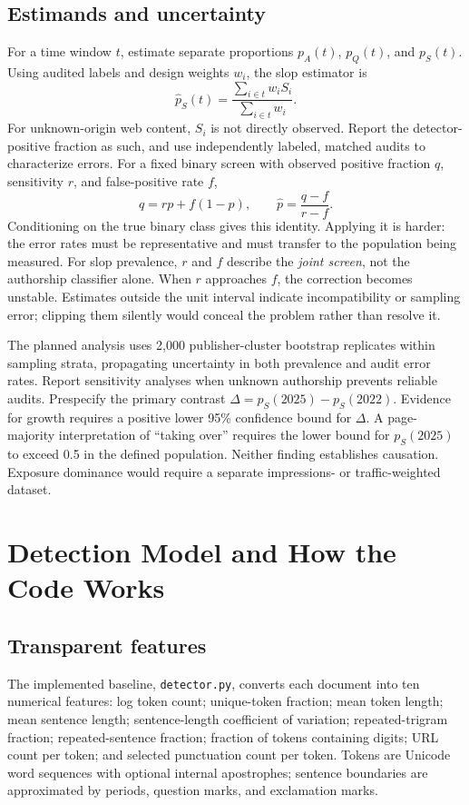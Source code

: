 \documentclass[11pt]{article}
\begin{document}
\subsection{Estimands and uncertainty}
For a time window $t$, estimate separate proportions $p_A(t)$, $p_Q(t)$, and
$p_S(t)$. Using audited labels and design weights $w_i$, the slop estimator is
\begin{equation}
 \widehat p_S(t)=\frac{\sum_{i\in t}w_i S_i}{\sum_{i\in t}w_i}.
\end{equation}
For unknown-origin web content, $S_i$ is not directly observed. Report the
detector-positive fraction as such, and use independently labeled, matched
audits to characterize errors. For a fixed binary screen with observed
positive fraction $q$, sensitivity $r$, and false-positive rate $f$,
\begin{equation}
 q = r p + f(1-p),\qquad
 \widehat p = \frac{q-f}{r-f}.
 \label{eq:correction}
\end{equation}
Conditioning on the true binary class gives this identity. Applying it is
harder: the error rates must be representative and must transfer to the
population being measured. For slop prevalence, $r$ and $f$ describe the
\emph{joint screen}, not the authorship classifier alone. When $r$ approaches
$f$, the correction becomes unstable. Estimates outside the unit interval
indicate incompatibility or sampling error; clipping them silently would
conceal the problem rather than resolve it.

The planned analysis uses 2,000 publisher-cluster bootstrap replicates within
sampling strata, propagating uncertainty in both prevalence and audit error
rates. Report sensitivity analyses when unknown authorship prevents reliable
audits. Prespecify the primary contrast
$\Delta=p_S(2025)-p_S(2022)$. Evidence for growth requires a positive lower
95\% confidence bound for $\Delta$. A page-majority interpretation of
``taking over'' requires the lower bound for $p_S(2025)$ to exceed 0.5 in the
defined population. Neither finding establishes causation. Exposure dominance
would require a separate impressions- or traffic-weighted dataset.

\section{Detection Model and How the Code Works}
\subsection{Transparent features}
The implemented baseline, \texttt{detector.py}, converts each document into
ten numerical features: log token count; unique-token fraction; mean token
length; mean sentence length; sentence-length coefficient of variation;
repeated-trigram fraction; repeated-sentence fraction; fraction of tokens
containing digits; URL count per token; and selected punctuation count per
token. Tokens are Unicode word sequences with optional internal apostrophes;
sentence boundaries are approximated by periods, question marks, and
exclamation marks.
\end{document}
